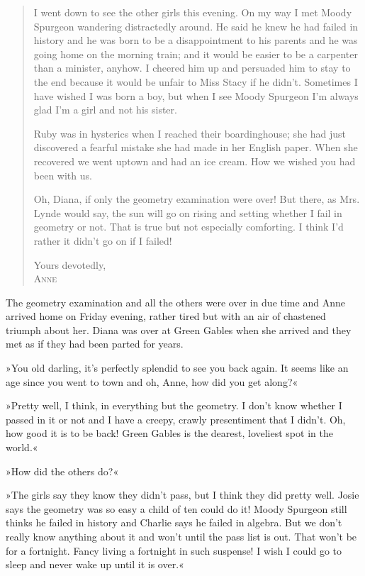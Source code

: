 \begin{quotation}
I went down to see the other girls this evening. On my way I met Moody Spurgeon wandering distractedly around. He said he knew he had failed in history and he was born to be a disappointment to his parents and he was going home on the morning train; and it would be easier to be a carpenter than a minister, anyhow. I cheered him up and persuaded him to stay to the end because it would be unfair to Miss Stacy if he didn’t. Sometimes I have wished I was born a boy, but when I see Moody Spurgeon I’m always glad I’m a girl and not his sister.

Ruby was in hysterics when I reached their boardinghouse; she had just discovered a fearful mistake she had made in her English paper. When she recovered we went uptown and had an ice cream. How we wished you had been with us.

Oh, Diana, if only the geometry examination were over! But there, as Mrs. Lynde would say, the sun will go on rising and setting whether I fail in geometry or not. That is true but not especially comforting. I think I’d rather it didn’t go on if I failed!
\begin{flushright}
Yours devotedly,\\
\textsc{Anne}
\end{flushright}
\end{quotation}

The geometry examination and all the others were over in due time and Anne arrived home on Friday evening, rather tired but with an air of chastened triumph about her. Diana was over at Green Gables when she arrived and they met as if they had been parted for years.

»You old darling, it’s perfectly splendid to see you back again. It seems like an age since you went to town and oh, Anne, how did you get along?«

»Pretty well, I think, in everything but the geometry. I don’t know whether I passed in it or not and I have a creepy, crawly presentiment that I didn’t. Oh, how good it is to be back! Green Gables is the dearest, loveliest spot in the world.«

»How did the others do?«

»The girls say they know they didn’t pass, but I think they did pretty well. Josie says the geometry was so easy a child of ten could do it! Moody Spurgeon still thinks he failed in history and Charlie says he failed in algebra. But we don’t really know anything about it and won’t until the pass list is out. That won’t be for a fortnight. Fancy living a fortnight in such suspense! I wish I could go to sleep and never wake up until it is over.«


